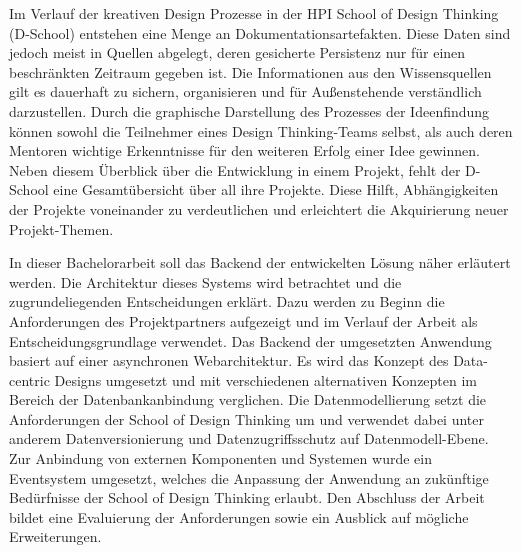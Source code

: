 
Im Verlauf der kreativen Design Prozesse in der HPI School of Design Thinking (D-School) entstehen eine Menge an Dokumentationsartefakten. Diese Daten sind jedoch meist in Quellen abgelegt, deren gesicherte Persistenz nur für einen beschränkten Zeitraum gegeben ist. Die Informationen aus den Wissensquellen gilt es dauerhaft zu sichern,  organisieren und für Außenstehende verständlich darzustellen. Durch die graphische Darstellung des Prozesses der Ideenfindung können sowohl die Teilnehmer eines Design Thinking-Teams selbst, als auch deren Mentoren wichtige Erkenntnisse für den weiteren Erfolg einer Idee gewinnen. Neben diesem Überblick über die Entwicklung in einem Projekt, fehlt der D-School eine Gesamtübersicht über all ihre Projekte. Diese Hilft, Abhängigkeiten der Projekte voneinander zu verdeutlichen und erleichtert die Akquirierung neuer Projekt-Themen. 

In dieser Bachelorarbeit soll das Backend der entwickelten Lösung  näher erläutert werden. Die Architektur dieses Systems wird betrachtet und die zugrundeliegenden Entscheidungen erklärt. Dazu werden zu Beginn die Anforderungen des Projektpartners aufgezeigt und im Verlauf der Arbeit als Entscheidungsgrundlage verwendet. Das Backend der umgesetzten Anwendung basiert auf einer asynchronen Webarchitektur. Es wird das Konzept des Data-centric Designs umgesetzt und mit verschiedenen alternativen Konzepten im Bereich der Datenbankanbindung verglichen. Die Datenmodellierung setzt die Anforderungen der School of Design Thinking um und verwendet dabei unter anderem Datenversionierung und Datenzugriffsschutz auf Datenmodell-Ebene. Zur Anbindung von externen Komponenten und Systemen wurde ein Eventsystem umgesetzt, welches die Anpassung der Anwendung an zukünftige Bedürfnisse der School of Design Thinking erlaubt. Den Abschluss der Arbeit bildet eine Evaluierung der Anforderungen sowie ein Ausblick auf mögliche Erweiterungen.
